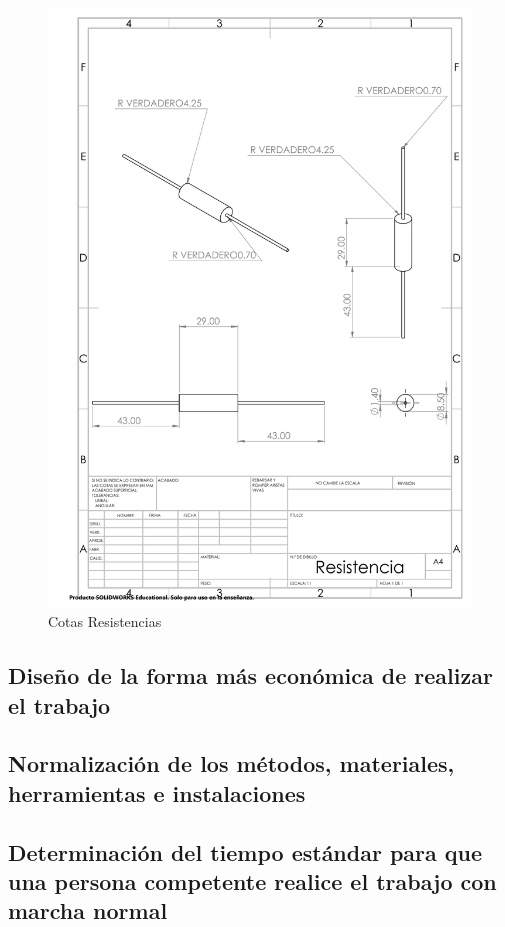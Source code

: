  \begin{figure}[H]
        \centering
        \includegraphics[trim = {0mm 0mm 0mm 0mm},clip,scale=0.2]{10/Img/cotasResistencia.pdf}
        \caption{Cotas Resistencias}
        \label{Plano Resistencias}
    \end{figure}
%
%
\subsection{Diseño de la forma más económica de realizar el trabajo}   


%    
%   
\subsection{Normalización de los métodos, materiales, herramientas e instalaciones}    

%
%
\subsection{Determinación del tiempo estándar para que una persona competente realice el trabajo con marcha normal}

